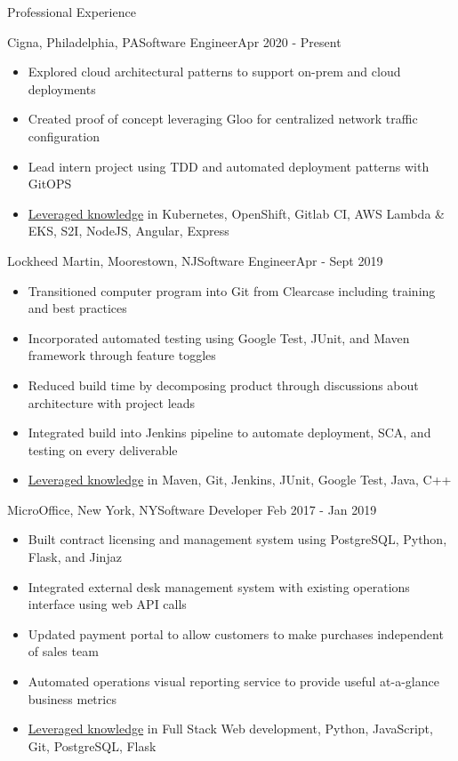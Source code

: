 \documentclass[]{mcdowellcv}
\begin{document}
	\begin{cvsection}{Professional Experience}
	    \begin{cvsubsection}{Cigna, Philadelphia, PA}{Software Engineer}{Apr 2020 - Present}
	        \begin{itemize}
	            \item Explored cloud architectural patterns to support on-prem and cloud deployments
	            \item Created proof of concept leveraging Gloo for centralized network traffic configuration
	            \item Lead intern project using TDD and automated deployment patterns with GitOPS
	            \item \underline{Leveraged knowledge} in Kubernetes, OpenShift, Gitlab CI, AWS Lambda & EKS, S2I, NodeJS, Angular, Express
	        \end{itemize}
	    \end{cvsubsection}
		\begin{cvsubsection}{Lockheed Martin, Moorestown, NJ}{Software Engineer}{Apr - Sept 2019}
			\begin{itemize}
				\item Transitioned computer program into Git from Clearcase including training and best practices
				\item Incorporated automated testing using Google Test, JUnit, and Maven framework through feature toggles
				\item Reduced build time by decomposing product through discussions about architecture with project leads
                \item Integrated build into Jenkins pipeline to automate deployment, SCA, and testing on every deliverable
                \item \underline{Leveraged knowledge} in Maven, Git, Jenkins, JUnit, Google Test, Java, C++
			\end{itemize}
		\end{cvsubsection}
		\begin{cvsubsection}{MicroOffice, New York, NY}{Software Developer}{ Feb 2017 - Jan 2019}
			\begin{itemize}
                \item Built contract licensing and management system using PostgreSQL, Python, Flask, and Jinjaz
                \item Integrated external desk management system with existing operations interface using web API calls
                \item Updated payment portal to allow customers to make purchases independent of sales team
                \item Automated operations visual reporting service to provide useful at-a-glance business metrics
                \item \underline{Leveraged knowledge} in Full Stack Web development, Python, JavaScript, Git, PostgreSQL, Flask
			\end{itemize}
		\end{cvsubsection}
	\end{cvsection}
	
\end{document}
